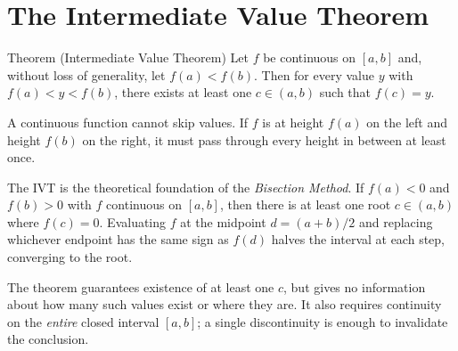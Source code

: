 \section*{The Intermediate Value Theorem}

\begin{theorembox}{Theorem (Intermediate Value Theorem)}
Let $f$ be continuous on $[a, b]$ and, without loss of generality,
let $f(a) < f(b)$.
Then for every value $y$ with $f(a) < y < f(b)$, there exists at
least one $c \in (a, b)$ such that $f(c) = y$.
\end{theorembox}

\begin{remark*}[Intuition]
A continuous function cannot skip values.
If $f$ is at height $f(a)$ on the left and height $f(b)$ on the right,
it must pass through every height in between at least once.
\end{remark*}

\begin{remark*}
The IVT is the theoretical foundation of the \emph{Bisection Method}.
If $f(a) < 0$ and $f(b) > 0$ with $f$ continuous on $[a, b]$, then
there is at least one root $c \in (a, b)$ where $f(c) = 0$.
Evaluating $f$ at the midpoint $d = (a + b)/2$ and replacing whichever
endpoint has the same sign as $f(d)$ halves the interval at each step,
converging to the root.
\end{remark*}

\begin{remark*}
The theorem guarantees existence of at least one $c$, but gives no
information about how many such values exist or where they are.
It also requires continuity on the \emph{entire} closed interval
$[a, b]$; a single discontinuity is enough to invalidate the
conclusion.
\end{remark*}